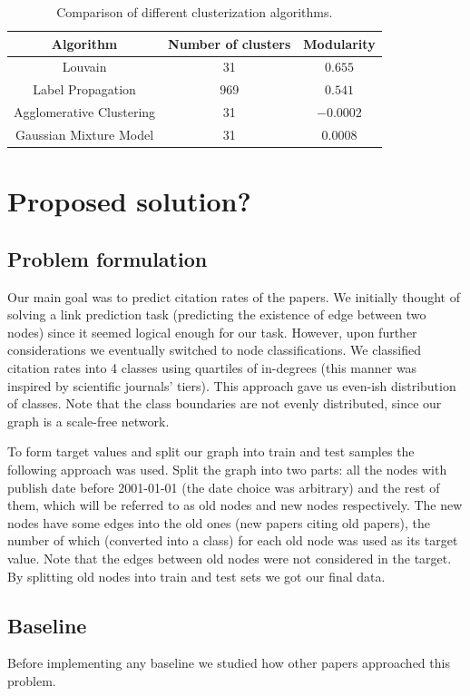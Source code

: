 \documentclass{article}
\begin{document}
\begin{table}[h]
\centering
\begin{tabular}{c c c}
\hline\hline
Algorithm & Number of clusters & Modularity \\
\hline
Louvain & 31 & $0.655$ \\
Label Propagation & 969 & $0.541$ \\
Agglomerative Clustering & 31 & $-0.0002$ \\
Gaussian Mixture Model & 31 & $0.0008$ \\
\hline
\end{tabular}
\caption{Comparison of different clusterization algorithms.}
\label{table:clusterization}
\end{table}

\section{Proposed solution?}
\subsection{Problem formulation}
Our main goal was to predict citation rates of the papers. We initially thought of solving a link prediction task (predicting the existence of edge between two nodes) since it seemed logical enough for our task. However, upon further considerations we eventually switched to node classifications. We classified citation rates into 4 classes using quartiles of in-degrees (this manner was inspired by scientific journals' tiers). This approach gave us even-ish distribution of classes. Note that the class boundaries are not evenly distributed, since our graph is a scale-free network.

To form target values and split our graph into train and test samples the following approach was used. Split the graph into two parts: all the nodes with publish date before 2001-01-01 (the date choice was arbitrary) and the rest of them, which will be referred to as old nodes and new nodes respectively. The new nodes have some edges into the old ones (new papers citing old papers), the number of which (converted into a class) for each old node was used as its target value. Note that the edges between old nodes were not considered in the target. By splitting old nodes into train and test sets we got our final data.

\subsection{Baseline}
Before implementing any baseline we studied how other papers approached this problem.
\end{document}
